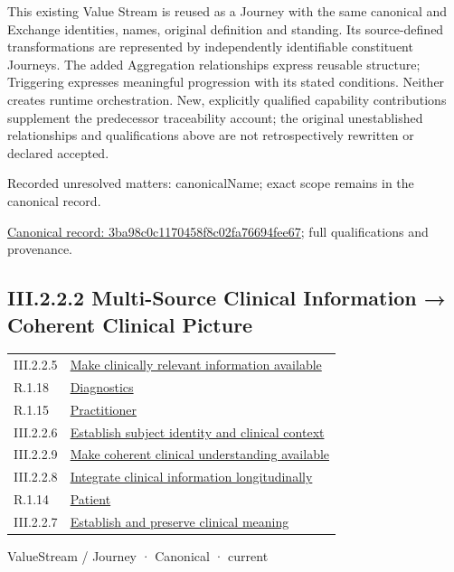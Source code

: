 This existing Value Stream is reused as a Journey with the same canonical and Exchange identities, names, original definition and standing. Its source-defined transformations are represented by independently identifiable constituent Journeys. The added Aggregation relationships express reusable structure; Triggering expresses meaningful progression with its stated conditions. Neither creates runtime orchestration. New, explicitly qualified capability contributions supplement the predecessor traceability account; the original unestablished relationships and qualifications above are not retrospectively rewritten or declared accepted.


{\small Recorded unresolved matters: canonicalName; exact scope remains in the canonical record.}\par
{\footnotesize \href{../../../../../../../continuum/strategy/value-stream/3ba98c0c1170458f8c02fa76694fee67.md}{Canonical record: 3ba98c0c1170458f8c02fa76694fee67}; full qualifications and provenance.}\par
\subsection*{III.2.2.2 Multi-Source Clinical Information → Coherent Clinical Picture}
\label{navigation:III.2.2.2}

\begin{longtable}{p{.22\linewidth}p{.73\linewidth}}
III.2.2.5 & \hyperref[element:2e20e48451b64dafa4fe7eaee2501c7a]{Make clinically relevant information available} \\
R.1.18 & \hyperref[element:46751a4e48a642a8b05831cfe4785007]{Diagnostics} \\
R.1.15 & \hyperref[element:49480591b4554983aaa82a79c1568bf3]{Practitioner} \\
III.2.2.6 & \hyperref[element:667853f4a4c343dcb559584cb08d71cf]{Establish subject identity and clinical context} \\
III.2.2.9 & \hyperref[element:75179fdde77f4c94a47756a7ae109b34]{Make coherent clinical understanding available} \\
III.2.2.8 & \hyperref[element:80b2d41cb7fc4c929cee667353caa411]{Integrate clinical information longitudinally} \\
R.1.14 & \hyperref[element:ad2012d59bb542e8bc7d8bd20547e342]{Patient} \\
III.2.2.7 & \hyperref[element:e64c4ed500d84f0fa84a12646ea8b98d]{Establish and preserve clinical meaning} \\
\end{longtable}
\label{element:01f655eae3d8485699449c3dcf4f9b56}
{\small ValueStream / Journey · Canonical · current}\par

